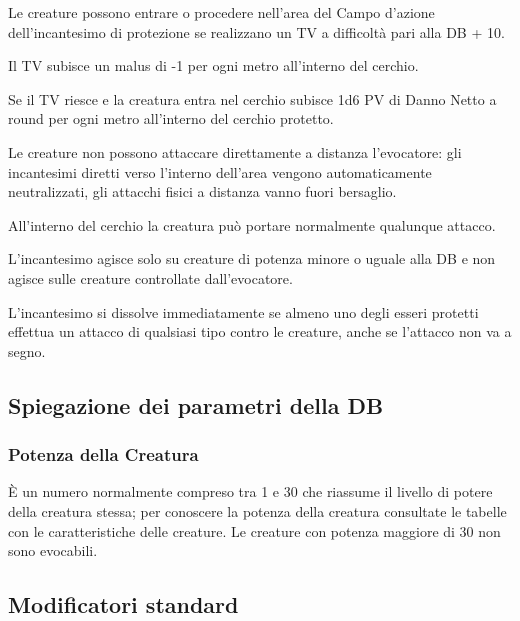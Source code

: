 Le creature possono entrare o procedere nell'area del Campo d'azione
dell'incantesimo di protezione se realizzano un TV a difficolt\`a
pari alla DB + 10.

Il TV subisce un malus di -1 per ogni metro all'interno del cerchio.

Se il TV riesce e la creatura entra nel cerchio subisce 1d6 PV di
Danno Netto a round per ogni metro all'interno del cerchio protetto.

Le creature non possono attaccare direttamente a distanza l'evocatore:
gli incantesimi diretti verso l'interno dell'area vengono
automaticamente neutralizzati, gli attacchi fisici a distanza vanno
fuori bersaglio.

All'interno del cerchio la creatura pu\`o portare normalmente
qualunque attacco.

L'incantesimo agisce solo su creature di potenza minore o uguale alla
DB e non agisce sulle creature controllate dall'evocatore.

L'incantesimo si dissolve immediatamente se almeno uno degli esseri
protetti effettua un attacco di qualsiasi tipo contro le creature,
anche se l'attacco non va a segno.




{\raggedright \subsection{Spiegazione dei parametri della DB}}

\subsubsection{Potenza della Creatura} 

\`E un numero normalmente
compreso tra 1 e 30 che riassume il livello di potere della creatura
stessa; per conoscere la potenza della creatura consultate le tabelle
con le caratteristiche delle creature. Le creature con potenza
maggiore di 30 non sono evocabili.

\subsection{Modificatori standard}

